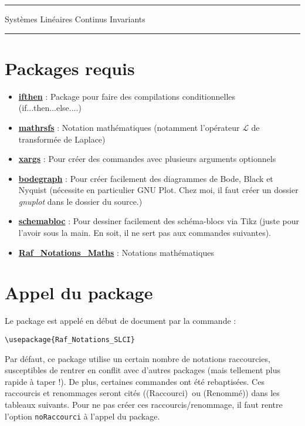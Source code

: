 \documentclass[a4paper,12pt]{article}
\newcommand{\rac}{({\color{red}Raccourci})}
\newcommand{\ren}{({\color{blue}Renommé})}
\begin{document}
	\begin{center}
		\hrule{\Large Systèmes Linéaires Continus Invariants}\\\hrule
	\end{center}


	\section{Packages requis}

		\begin{itemize}
			\item \href{http://www.ctan.org/pkg/ifthen}{\textbf{ifthen}} : Package pour faire des compilations conditionnelles (if...then...else....)
			\item \href{http://www.ctan.org/pkg/mathrsfs}{\textbf{mathrsfs}} : Notation mathématiques (notamment l'opérateur $\mathscr{L}$ de transformée de Laplace)
			\item \href{http://www.ctan.org/pkg/xargs}{\textbf{xargs}} : Pour créer des commandes avec plusieurs arguments optionnels
			\item \href{http://sciences-indus-cpge.papanicola.info/Bode-Black-et-Nyquist-avec-Tikz}{\textbf{bodegraph}} : Pour créer facilement des diagrammes de Bode, Black et Nyquist (nécessite en particulier GNU Plot. Chez moi, il faut créer un dossier \emph{gnuplot} dans le dossier du source.)
			\item \href{http://sciences-indus-cpge.papanicola.info/Schema-blocs-avec-PGF-TIKZ-sous}{\textbf{schemabloc}} : Pour dessiner facilement des schéma-blocs via Tikz (juste pour l'avoir sous la main. En soit, il ne sert pas aux commandes suivantes).
			\item \href{http://enseignement.allais.eu/page-latex}{\textbf{Raf\_Notations\_Maths}} : Notations mathématiques
		\end{itemize}

	\section{Appel du package}

		Le package est appelé en début de document par la commande :
		\begin{verbatim}
\usepackage{Raf_Notations_SLCI}
		\end{verbatim}

	Par défaut, ce package utilise un certain nombre de notations raccourcies, susceptibles de rentrer en conflit avec d'autres packages (mais tellement plus rapide à taper !).
	De plus, certaines commandes ont été rebaptisées.
	Ces raccourcis et renommages seront cités (\rac\ ou \ren) dans les tableaux suivants.
	Pour ne pas créer ces raccourcis/renommage, il faut rentre l'option \verb!noRaccourci! à l'appel du package.
\end{document}
